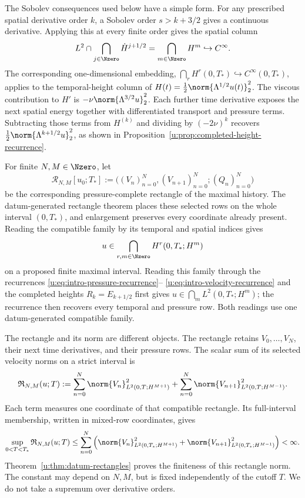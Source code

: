 The Sobolev consequences used below have a simple form. For any prescribed
spatial derivative order \(k\), a Sobolev order
\(s>k+3/2\) gives a continuous derivative.  Applying this at every finite
order gives the spatial column
\[
 L^2\cap\bigcap_{j\in\Nzero}\dot H^{j+1/2}
 =\bigcap_{m\in\Nzero}H^m\hookrightarrow C^\infty.
\]
The corresponding one-dimensional embedding,
\(\bigcap_r H^r(0,T_*)\hookrightarrow C^\infty(0,T_*)\), applies to
the temporal-height column of
\(H(t)=\tfrac12\norm{\Lambda^{1/2}u(t)}_2^2\).
The viscous contribution to \(H'\) is
\(-\nu\norm{\Lambda^{3/2}u}_2^2\).  Each further time derivative exposes
the next spatial energy together with differentiated transport and pressure
terms.  Subtracting those terms from \(H^{(k)}\) and dividing by
\((-2\nu)^k\) recovers \(\tfrac12\norm{\Lambda^{k+1/2}u}_2^2\), as shown
in Proposition~\ref{u:prop:completed-height-recurrence}.

For finite \(N,M\in\Nzero\), let
\[
 \mathcal R_{N,M}[u_0;T_*]
 :=\bigl((V_n)_{n=0}^{N},(V_{n+1})_{n=0}^{N};(Q_n)_{n=0}^{N}\bigr)
\]
be the corresponding pressure-complete rectangle of the maximal history.
The datum-generated rectangle theorem places these selected rows on the whole
interval \((0,T_*)\), and enlargement preserves every coordinate already
present.  Reading the compatible family by its temporal and spatial indices
gives
\begin{equation}
 u\in\bigcap_{r,m\in\Nzero}H^r(0,T_*;H^m)
 \label{u:eq:intro-all-orders-intersection}
\end{equation}
on a proposed finite maximal interval.  Reading this family through the
recurrences \eqref{u:eq:intro-pressure-recurrence}--%
\eqref{u:eq:intro-velocity-recurrence} and the completed heights
\(R_k=E_{k+1/2}\) first gives
\(u\in\bigcap_mL^2(0,T_*;H^m)\); the recurrence then recovers every temporal
and pressure row.  Both readings use one datum-generated compatible
family.

The rectangle and its norm are different objects.  The rectangle retains
\(V_0,\ldots,V_N\), their next time derivatives, and their pressure rows.
The scalar sum of its selected velocity norms on a strict interval is
\begin{equation}
 \mathfrak R_{N,M}(u;T)
 :=\sum_{n=0}^{N}\norm{V_n}_{L^2(0,T;H^{M+1})}^2
 +\sum_{n=0}^{N}\norm{V_{n+1}}_{L^2(0,T;H^{M-1})}^2.
 \label{u:eq:intro-rectangle-norm}
\end{equation}
Each term measures one coordinate of that compatible rectangle.  Its
full-interval membership, written in mixed-row coordinates, gives
\begin{equation}
 \sup_{0<T<T_*}\mathfrak R_{N,M}(u;T)
 \le\sum_{n=0}^N\left(
 \norm{V_n}_{L^2(0,T_*;H^{M+1})}^2
 +\norm{V_{n+1}}_{L^2(0,T_*;H^{M-1})}^2\right)<\infty.
 \label{u:eq:intro-terminal-rectangle}
\end{equation}
Theorem~\ref{u:thm:datum-rectangles} proves the finiteness of this rectangle norm.
The constant may depend on \(N,M\), but is fixed independently of the
cutoff \(T\).  We do not take a supremum over derivative orders.

